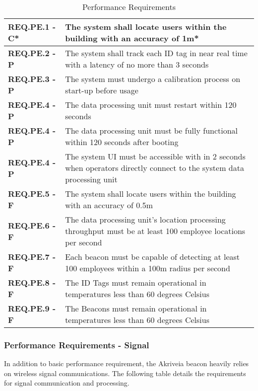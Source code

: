 \bigskip
\bgroup
\def\arraystretch{1.5}
\begin{table}[H]
\centering
\begin{tabular}{ | m{3.5cm} | m{12.5cm} |}
 \hline
 \textbf{REQ.PE.1 - C*} & The system shall locate users within the building with an accuracy of 1m* \\
\hline
 \textbf{REQ.PE.2 - P} & The system shall track each ID tag in near real time with a latency of no more than 3 seconds \\
\hline
 \textbf{REQ.PE.3 - P} & The system must undergo a calibration process on start-up before usage \\
\hline
 \textbf{REQ.PE.4 - P} & The data processing unit must restart within 120 seconds \\
\hline
 \textbf{REQ.PE.4 - P} & The data processing unit must be fully functional within 120 seconds after booting \\
\hline
 \textbf{REQ.PE.4 - P} & The system UI must be accessible with in 2 seconds when operators directly connect to the system data processing unit \\
\hline
 \textbf{REQ.PE.5 - F} & The system shall locate users within the building with an accuracy of 0.5m \\
\hline
 \textbf{REQ.PE.6 - F} & The data processing unit's location processing throughput must be at least 100 employee locations per second \\
\hline
 \textbf{REQ.PE.7 - F} & Each beacon must be capable of detecting at least 100 employees within a 100m radius per second \\
\hline
 \textbf{REQ.PE.8 - F} & The ID Tags must remain operational in temperatures less than 60 degrees Celsius \\
\hline
 \textbf{REQ.PE.9 - F} & The Beacons must remain operational in temperatures less than 60 degrees Celsius \\
\hline
\end{tabular}
\caption{Performance Requirements}
\end{table}

\break

\subsubsection{Performance Requirements - Signal}
\medskip
In addition to basic performance requirement, the Akriveia beacon heavily relies on wireless signal communications. The following table details the requirements for signal communication and processing.
\bigskip

